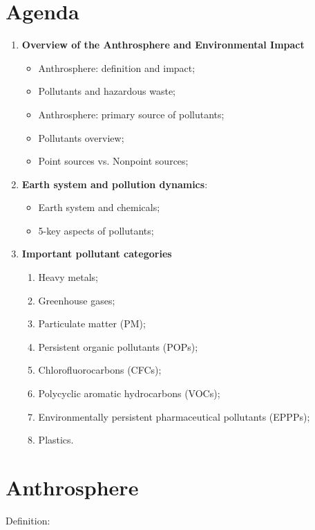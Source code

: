 \documentclass{article}
\begin{document}
\section{Agenda}
\begin{enumerate}
    \item \textbf{Overview of the Anthrosphere and Environmental Impact}
        \begin{itemize}
            \item Anthrosphere: definition and impact;
            \item Pollutants and hazardous waste;
            \item Anthrosphere: primary source of pollutants;
            \item Pollutants overview;
            \item Point sources vs. Nonpoint sources;
        \end{itemize}
    \item \textbf{Earth system and pollution dynamics}:
        \begin{itemize}
            \item Earth system and chemicals;
            \item 5-key aspects of pollutants;
        \end{itemize}
    \item \textbf{Important pollutant categories}
        \begin{enumerate}[label=\arabic*.]
            \item Heavy metals;
            \item Greenhouse gases;
            \item Particulate matter (PM);
            \item Persistent organic pollutants (POPs);
            \item Chlorofluorocarbons (CFCs);
            \item Polycyclic aromatic hydrocarbons (VOCs);
            \item Environmentally persistent pharmaceutical pollutants (EPPPs);
            \item Plastics.
        \end{enumerate}
\end{enumerate}

\newpage
\section{Anthrosphere}
Definition:
\end{document}
